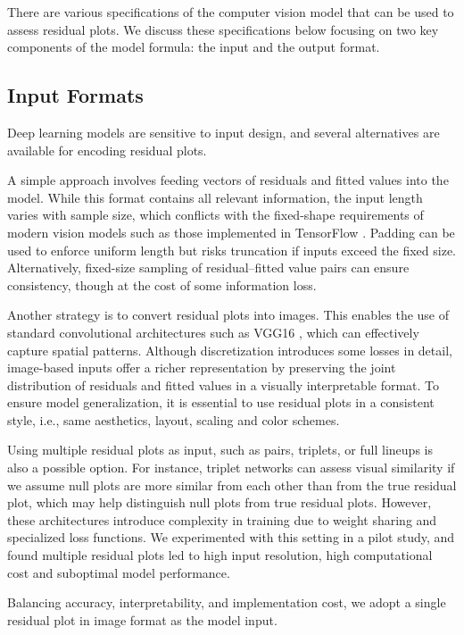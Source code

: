 \documentclass[]{interact}
\theoremstyle{plain}%
\theoremstyle{definition}
\theoremstyle{remark}
\begin{document}
There are various specifications of the computer vision model that can
be used to assess residual plots. We discuss these specifications below
focusing on two key components of the model formula: the input and the
output format.

\subsection{Input Formats}\label{input-formats}

Deep learning models are sensitive to input design, and several
alternatives are available for encoding residual plots.

A simple approach involves feeding vectors of residuals and fitted
values into the model. While this format contains all relevant
information, the input length varies with sample size, which conflicts
with the fixed-shape requirements of modern vision models such as those
implemented in TensorFlow \citep{abadi2016tensorflow}. Padding can be
used to enforce uniform length but risks truncation if inputs exceed the
fixed size. Alternatively, fixed-size sampling of residual--fitted value
pairs can ensure consistency, though at the cost of some information
loss.

Another strategy is to convert residual plots into images. This enables
the use of standard convolutional architectures such as VGG16
\citep{simonyan2014very}, which can effectively capture spatial
patterns. Although discretization introduces some losses in detail,
image-based inputs offer a richer representation by preserving the joint
distribution of residuals and fitted values in a visually interpretable
format. To ensure model generalization, it is essential to use residual
plots in a consistent style, i.e., same aesthetics, layout, scaling and
color schemes.

Using multiple residual plots as input, such as pairs, triplets, or full
lineups is also a possible option. For instance, triplet networks
\citep{chopra2005learning} can assess visual similarity if we assume
null plots are more similar from each other than from the true residual
plot, which may help distinguish null plots from true residual plots.
However, these architectures introduce complexity in training due to
weight sharing and specialized loss functions. We experimented with this
setting in a pilot study, and found multiple residual plots led to high
input resolution, high computational cost and suboptimal model
performance.

Balancing accuracy, interpretability, and implementation cost, we adopt
a single residual plot in image format as the model input.
\end{document}
